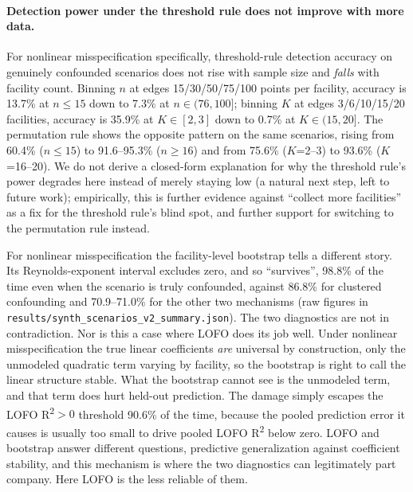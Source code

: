 \documentclass[journal=dce]{CUP-JNL-DTM}%
\begin{document}
\paragraph{Detection power under the threshold rule does not improve with more data.} For nonlinear misspecification specifically, threshold-rule detection accuracy on genuinely confounded scenarios does not rise with sample size and \emph{falls} with facility count. Binning $n$ at edges 15/30/50/75/100 points per facility, accuracy is 13.7\% at $n\leq15$ down to 7.3\% at $n\in(76,100]$; binning $K$ at edges 3/6/10/15/20 facilities, accuracy is 35.9\% at $K\in[2,3]$ down to 0.7\% at $K\in(15,20]$. The permutation rule shows the opposite pattern on the same scenarios, rising from 60.4\% ($n\leq15$) to 91.6--95.3\% ($n\geq16$) and from 75.6\% ($K$=2--3) to 93.6\% ($K$=16--20). We do not derive a closed-form explanation for why the threshold rule's power degrades here instead of merely staying low (a natural next step, left to future work); empirically, this is further evidence against ``collect more facilities'' as a fix for the threshold rule's blind spot, and further support for switching to the permutation rule instead.

For nonlinear misspecification the facility-level bootstrap tells a different story. Its Reynolds-exponent interval excludes zero, and so ``survives'', 98.8\% of the time even when the scenario is truly confounded, against 86.8\% for clustered confounding and 70.9--71.0\% for the other two mechanisms (raw figures in \texttt{results/synth\_scenarios\_v2\_summary.json}). The two diagnostics are not in contradiction. Nor is this a case where LOFO does its job well. Under nonlinear misspecification the true linear coefficients \emph{are} universal by construction, only the unmodeled quadratic term varying by facility, so the bootstrap is right to call the linear structure stable. What the bootstrap cannot see is the unmodeled term, and that term does hurt held-out prediction. The damage simply escapes the LOFO R\textsuperscript{2}$>0$ threshold 90.6\% of the time, because the pooled prediction error it causes is usually too small to drive pooled LOFO R\textsuperscript{2} below zero. LOFO and bootstrap answer different questions, predictive generalization against coefficient stability, and this mechanism is where the two diagnostics can legitimately part company. Here LOFO is the less reliable of them.
\end{document}
